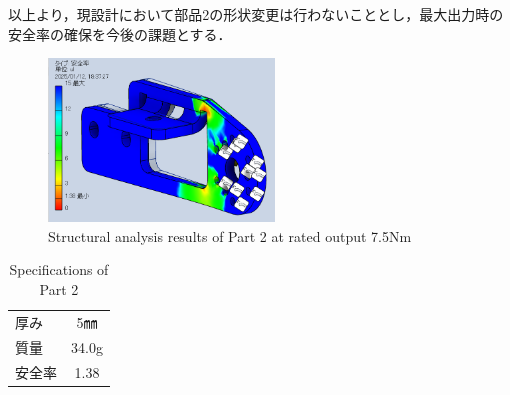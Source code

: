 以上より，現設計において部品2の形状変更は行わないこととし，最大出力時の安全率の確保を今後の課題とする．
\begin{figure}[h]
  \centering
  \includegraphics[width=6cm]{images/design/pitchok.png}
  \caption{Structural analysis results of Part 2 at rated output 7.5Nm}
  \label{fig:pitchok}
\end{figure}
\begin{table}[h]
  \centering
  \caption{Specifications of Part 2}
  \begin{tabular}{lc}
    \hline
    厚み & 5㎜ \\ 
    質量 & 34.0g \\ 
    安全率 & 1.38 \\ \hline
  \end{tabular}
  \label{tab:part2_spec}
\end{table}

\newpage